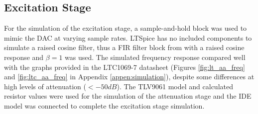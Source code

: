 \subsection{Excitation Stage}
For the simulation of the excitation stage, a sample-and-hold block was used to mimic the DAC at varying sample rates. LTSpice has no included components to simulate a raised cosine filter, thus a FIR filter block from \cite{FilterManual} with a raised cosine response and $\beta = 1$ was used. The simulated frequency response compared well with the graphs provided in the LTC1069-7 datasheet (Figures \ref{fig:lt_aa_freq} and \ref{fig:ltc_aa_freq} in Appendix \ref{appen:simulation}), despite some differences at high levels of attenuation ($<-50dB$). The TLV9061 model and calculated resistor values were used for the simulation of the attenuation stage and the \ac{IDE} model was connected to complete the excitation stage simulation.


